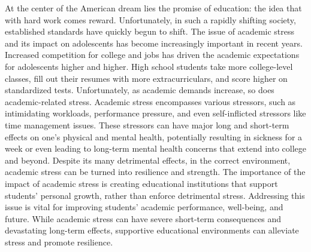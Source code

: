 \documentclass[12pt, a4paper, twoside]{article}
\begin{document}
\maketitle{}

At the center of the American dream lies the promise of education: the idea that with hard work comes reward. Unfortunately, in such a rapidly shifting society, established standards have quickly begun to shift. The issue of academic stress and its impact on adolescents has become increasingly important in recent years. Increased competition for college and jobs has driven the academic expectations for adolescents higher and higher. High school students take more college-level classes, fill out their resumes with more extracurriculars, and score higher on standardized tests. Unfortunately, as academic demands increase, so does academic-related stress. Academic stress encompasses various stressors, such as intimidating workloads, performance pressure, and even self-inflicted stressors like time management issues. These stressors can have major long and short-term effects on one’s physical and mental health, potentially resulting in sickness for a week or even leading to long-term mental health concerns that extend into college and beyond. Despite its many detrimental effects, in the correct environment, academic stress can be turned into resilience and strength. The importance of the impact of academic stress is creating educational institutions that support students’ personal growth, rather than enforce detrimental stress. Addressing this issue is vital for improving students' academic performance, well-being, and future. While academic stress can have severe short-term consequences and devastating long-term effects, supportive educational environments can alleviate stress and promote resilience. 
\end{document}
